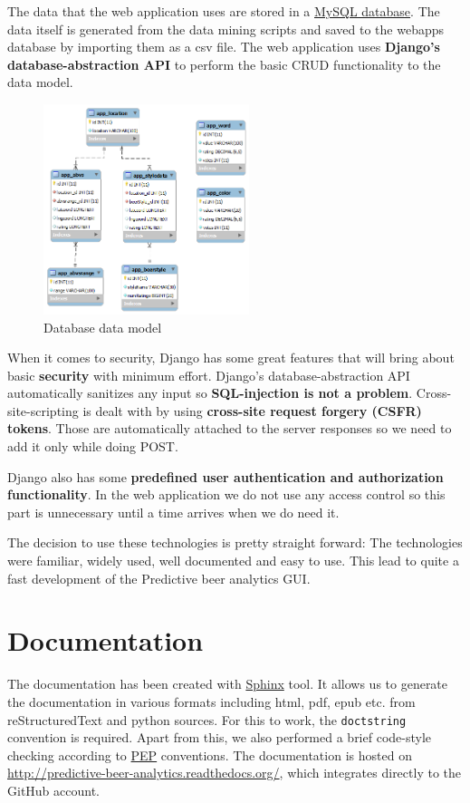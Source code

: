 \documentclass[10pt]{IEEEtran}
\begin{document}
The data that the web application uses are stored in a \href{http://www.mysql.com/}{MySQL database}.
The data itself is generated from the data mining scripts and saved to the webapps database by importing them as a csv file.
The web application uses \textbf{Django's database-abstraction API} to perform the basic CRUD functionality to the data model.

\begin{figure}[t]
  \centering
  \includegraphics[width=6cm]{./graphics/pbaDataModel.png}
  \caption{Database data model}
  \label{fig:colorspace}
\end{figure}
 
When it comes to security, Django has some great features that will bring about basic \textbf{security} with minimum effort.
Django's database-abstraction API automatically sanitizes any input so \textbf{SQL-injection is not a problem}.
Cross-site-scripting is dealt with by using \textbf{cross-site request forgery (CSFR) tokens}. Those are automatically attached to the server responses so we need to add it only while doing POST.

Django also has some \textbf{predefined user authentication and authorization functionality}.
In the web application we do not use any access control so this part is unnecessary until a time arrives when we do need it.

The decision to use these technologies is pretty straight forward:
The technologies were familiar, widely used, well documented and easy to use.
This lead to quite a fast development of the Predictive beer analytics GUI.

\section{Documentation}
The documentation has been created with \href{http://sphinx-doc.org/}{Sphinx} tool. It allows us to generate the documentation in various formats including html, pdf, epub etc. from reStructuredText and python sources. For this to work, the \texttt{doctstring} convention is required. Apart from this, we also performed a brief code-style checking according to \href{https://www.python.org/dev/peps/}{PEP} conventions. The documentation is hosted on \href{http://predictive-beer-analytics.readthedocs.org/}{http://predictive-beer-analytics.readthedocs.org/}, which integrates directly to the GitHub account.
\end{document}

